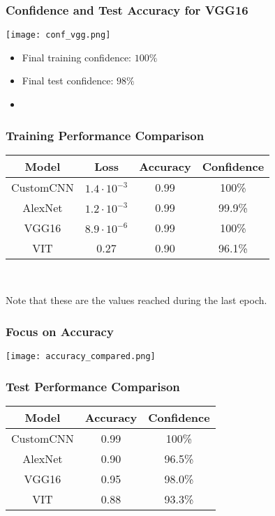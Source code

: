 \documentclass[../presentation.tex]{subfiles} %
\begin{document}
\begin{frame}
    \frametitle{Confidence and Test Accuracy for VGG16}
    \begin{center}
        \texttt{[image: conf\_vgg.png]}
    \end{center}

    \small{
    \begin{cbox}
        \begin{itemize}
            \item Final training confidence: $100\%$
            \item Final test confidence: $98\%$
            \item {}
        \end{itemize}
    \end{cbox}
    }
\end{frame}

\begin{frame}
    \frametitle{Training Performance Comparison}
    \centering
    \begin{tabular}{|c|c|c|c|}
        \hline
        \textbf{Model} & \textbf{Loss} & \textbf{Accuracy} & \textbf{Confidence} \\
        \hline
        CustomCNN & $1.4 \cdot 10^{-3}$ & 0.99 & 100\% \\
        AlexNet & $1.2 \cdot 10^{-3}$ & 0.99 & 99.9\% \\
        VGG16 & $8.9 \cdot 10^{-6}$ & 0.99 & 100\% \\
        VIT & 0.27 & 0.90 & 96.1\% \\
        \hline
    \end{tabular}\\
    \begin{cbox}
        Note that these are the values reached during the last epoch.
    \end{cbox}
\end{frame}

\begin{frame}
    \frametitle{Focus on Accuracy}
    \begin{center}
        \texttt{[image: accuracy\_compared.png]}
    \end{center}
\end{frame}

\begin{frame}
    \frametitle{Test Performance Comparison}
    \centering
    \begin{tabular}{|c|c|c|}
        \hline
        \textbf{Model} & \textbf{Accuracy} & \textbf{Confidence} \\
        \hline
        CustomCNN & 0.99 & 100\% \\
        AlexNet & 0.90 & 96.5\% \\
        VGG16 & 0.95 & 98.0\% \\
        VIT & 0.88 & 93.3\% \\
        \hline
    \end{tabular}\\

\end{frame}
\end{document}
